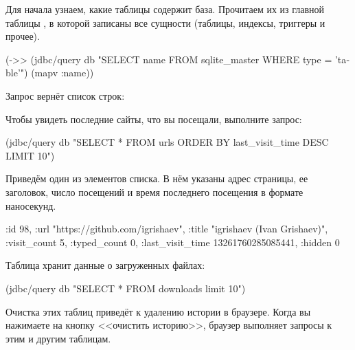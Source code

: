 Для начала узнаем, какие таблицы содержит база. Прочитаем их из главной таблицы , в которой записаны все сущности (таблицы, индексы, триггеры и прочее).

\begin{english}
  \begin{clojure}
(->> (jdbc/query db "SELECT name FROM sqlite_master
                     WHERE type = 'table'")
     (mapv :name))
  \end{clojure}
\end{english}

Запрос вернёт список строк:

\begin{english}
  \begin{clojure}
  \end{clojure}
\end{english}

Чтобы увидеть последние сайты, что вы посещали, выполните запрос:

\begin{english}
  \begin{clojure}
(jdbc/query db
  "SELECT * FROM urls
   ORDER BY last_visit_time DESC LIMIT 10")
  \end{clojure}
\end{english}

Приведём один из элементов списка. В нём указаны адрес страницы, ее заголовок, число посещений и время последнего посещения в формате наносекунд.

\begin{english}
  \begin{clojure}
{:id 98,
 :url "https://github.com/igrishaev",
 :title "igrishaev (Ivan Grishaev)",
 :visit_count 5,
 :typed_count 0,
 :last_visit_time 13261760285085441,
 :hidden 0}
  \end{clojure}
\end{english}

Таблица  хранит данные о загруженных файлах:

\begin{english}
  \begin{clojure}
(jdbc/query db "SELECT * FROM downloads limit 10")
  \end{clojure}
\end{english}

Очистка этих таблиц приведёт к удалению истории в браузере. Когда вы нажимаете на кнопку <<очистить историю>>, браузер выполняет запросы  к этим и другим таблицам.

